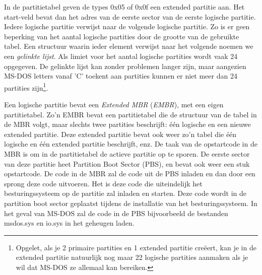 In de partitietabel geven de types 0x05 of 0x0f een extended
partitie aan. Het start-veld bevat dan het adres van de eerste sector
van de eerste logische partitie. Iedere logische partitie verwijst
naar de volgende logische partitie. Zo is er geen beperking van het
aantal logische partities door de grootte van de gebruikte tabel. Een
structuur waarin ieder element verwijst naar het volgende noemen we
een \emph{gelinkte lijst}. Als limiet voor het aantal
logische partities wordt vaak 24 opgegeven. De gelinkte lijst kan
zonder problemen langer zijn, maar aangezien MS-DOS letters vanaf 'C'
toekent aan partities kunnen er niet meer dan 24 partities
zijn\footnote{Opgelet, als je 2 primaire partities en 1 extended partitie
cre\"eert, kan je in de extended partitie natuurlijk nog maar 22 logische
partities aanmaken als je wil dat MS-DOS ze allemaal kan bereiken.}.

Een logische partitie bevat een \emph{Extended
MBR} (\emph{EMBR}), met een eigen
partitietabel. Zo'n EMBR bevat een partitietabel die de structuur van
de tabel in de MBR volgt, maar slechts twee partities beschrijft: \'e\'en
logische en een nieuwe extended partitie. Deze extended partitie bevat
ook weer zo'n tabel die \'e\'en logische en \'e\'en extended partitie
beschrijft, enz. De taak van de opstartcode in de MBR is om in de
partitietabel de actieve partitie op te sporen. De eerste sector van
deze partitie heet Partition Boot Sector (PBS), en bevat ook weer een
stuk opstartcode. De code in de MBR zal de code uit de PBS inladen en
dan door een sprong deze code uitvoeren. Het is deze code die
uiteindelijk het besturingssysteem op de partitie zal inladen en
starten. Deze code wordt in de partition boot sector geplaatst tijdens
de installatie van het besturingssysteem. In het geval van MS-DOS zal
de code in de PBS bijvoorbeeld de bestanden msdos.sys en io.sys in het
geheugen laden.
